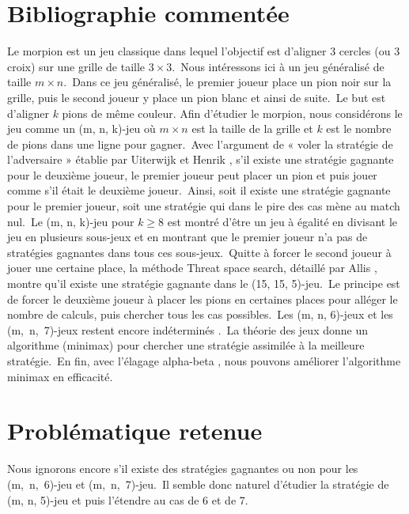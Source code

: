 \documentclass[12pt,a4paper]{article}
\begin{document}
\section*{\bfseries Bibliographie commentée}
\hspace*{7mm}Le morpion est un jeu classique dans lequel l'objectif est d'aligner 3 cercles (ou 3 croix) sur une grille de taille $3 \times 3$.~Nous intéressons ici à un jeu généralisé de taille $m \times n$.~Dans ce jeu généralisé, le premier joueur place un pion noir sur la grille, puis le second joueur y place un pion blanc et ainsi de suite.~Le but est d'aligner $k$ pions de même couleur.\newline
\hspace*{7mm}Afin d'étudier le morpion, nous considérons le jeu comme un (m, n, k)-jeu où $m\times n$ est la taille de la grille et $k$ est le nombre de pions dans une ligne pour gagner.~Avec l'argument de « voler la stratégie de l'adversaire » établie par Uiterwijk et Henrik \cite{steal}, s'il existe une stratégie gagnante pour le deuxième joueur, le premier joueur peut placer un pion et puis jouer comme s'il était le deuxième joueur.~Ainsi, soit il existe une stratégie gagnante pour le premier joueur, soit une stratégie qui dans le pire des cas mène au match nul.~Le (m, n, k)-jeu pour $k\ge 8$ est montré d'être un jeu à égalité \cite{9-win, 8-win} en divisant le jeu en plusieurs sous-jeux et en montrant que le premier joueur n'a pas de stratégies gagnantes dans tous ces sous-jeux.~Quitte à forcer le second joueur à jouer une certaine place, la méthode Threat space search, détaillé par Allis \cite{Threat}, montre qu'il existe une stratégie gagnante dans le (15, 15, 5)-jeu.~Le principe est de forcer le deuxième joueur à placer les pions en certaines places pour alléger le nombre de calculs, puis chercher tous les cas possibles.~Les (m, n, 6)-jeux et les \mbox{(m, n, 7)-jeux} restent encore indéterminés \cite{67-win}.~La théorie des jeux donne un algorithme (minimax) \cite{minimax} pour chercher une stratégie assimilée à la meilleure stratégie.~En fin, avec l'élagage alpha-beta \cite{alpha-beta}, nous pouvons améliorer l'algorithme minimax en efficacité.


\newpage

\section*{\bfseries Problématique retenue}
\hspace*{7mm}Nous ignorons encore s'il existe des stratégies gagnantes ou non pour les \mbox{(m, n, 6)-jeu} et \newline \mbox{(m, n, 7)-jeu}.~Il semble donc naturel d'étudier la stratégie de (m, n, 5)-jeu et puis l'étendre au cas de 6 et de 7. 
\end{document}
